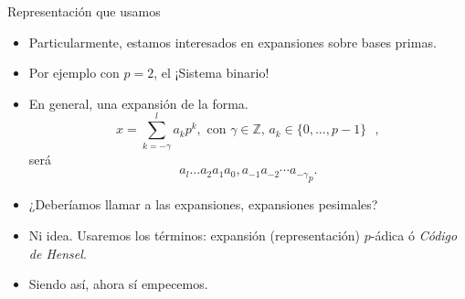 \documentclass{beamer}
\theoremstyle{definition}
\numberwithin{equation}{section}
\newcommand{\tit}[1]{\textit{#1}}
\newcommand{\Z}{\mathbb{Z}}
\begin{document}
\begin{frame}{Representación que usamos}
	\begin{itemize}[<+- | alert@+>]
		\item Particularmente, estamos interesados en expansiones sobre bases primas.
		\item Por ejemplo con $p=2$, el ¡Sistema binario!
		\item En general, una expansión de la forma.	$$x=\sum_{k=-\gamma}^{l}a_kp^k,\text{ con $\gamma\in\Z$, $a_k\in \{0,\dots,p-1\}$ },$$
		será
		\begin{equation}\label{notacion}
		{a_{l} \ldots a_{2} a_{1} a_{0},a_{-1}a_{-2}\cdots a_{-\gamma}}_p.
		\end{equation}
		\item ¿Deberíamos llamar a las expansiones, expansiones pesimales?
		\item Ni idea. Usaremos los términos: expansión (representación) $p$-ádica ó \tit{Código de Hensel}.
		\item Siendo así, ahora sí empecemos.
	\end{itemize}

\end{frame}
\end{document}
